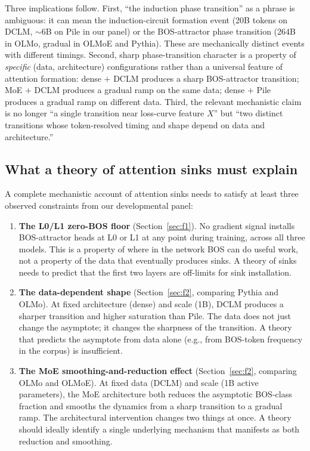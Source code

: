 \documentclass[11pt]{article}
\begin{document}
Three implications follow. First, ``the induction phase transition'' as a
phrase is ambiguous: it can mean the induction-circuit formation event
(20B tokens on DCLM, $\sim$6B on Pile in our panel) or the BOS-attractor
phase transition (264B in OLMo, gradual in OLMoE and Pythia). These are
mechanically distinct events with different timings. Second, sharp
phase-transition character is a property of \emph{specific} (data,
architecture) configurations rather than a universal feature of attention
formation: dense $+$ DCLM produces a sharp BOS-attractor transition;
MoE $+$ DCLM produces a gradual ramp on the same data; dense $+$ Pile
produces a gradual ramp on different data. Third, the relevant
mechanistic claim is no longer ``a single transition near loss-curve
feature $X$'' but ``two distinct transitions whose token-resolved timing
and shape depend on data and architecture.''

\subsection{What a theory of attention sinks must explain}

A complete mechanistic account of attention sinks needs to satisfy at
least three observed constraints from our developmental panel:

\begin{enumerate}
\item \textbf{The L0/L1 zero-BOS floor} (Section~\ref{sec:f1}). No
      gradient signal installs BOS-attractor heads at L0 or L1 at any
      point during training, across all three models. This is a property
      of where in the network BOS can do useful work, not a property of
      the data that eventually produces sinks. A theory of sinks needs
      to predict that the first two layers are off-limits for sink
      installation.
\item \textbf{The data-dependent shape} (Section~\ref{sec:f2}, comparing
      Pythia and OLMo). At fixed architecture (dense) and scale (1B),
      DCLM produces a sharper transition and higher saturation than
      Pile. The data does not just change the asymptote; it changes the
      sharpness of the transition. A theory that predicts the asymptote
      from data alone (e.g., from BOS-token frequency in the corpus)
      is insufficient.
\item \textbf{The MoE smoothing-and-reduction effect}
      (Section~\ref{sec:f2}, comparing OLMo and OLMoE). At fixed data
      (DCLM) and scale (1B active parameters), the MoE architecture
      both reduces the asymptotic BOS-class fraction and smooths the
      dynamics from a sharp transition to a gradual ramp. The
      architectural intervention changes two things at once. A theory
      should ideally identify a single underlying mechanism that
      manifests as both reduction and smoothing.
\end{enumerate}
\end{document}
